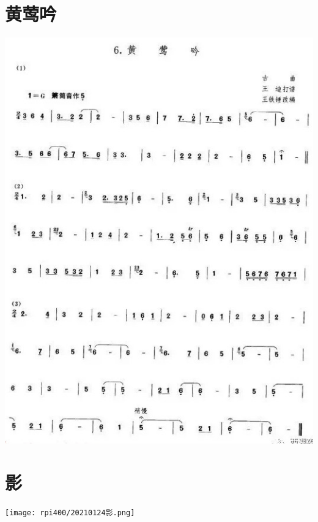 \documentclass[cn,pad,twocol]{elegantbook}
\begin{document}
\section{黄莺吟}\includegraphics[width=\textwidth]{dongxiao/20200819/黄莺吟.jpeg}
\section{影}\texttt{[image: rpi400/20210124影.png]}
\end{document}
